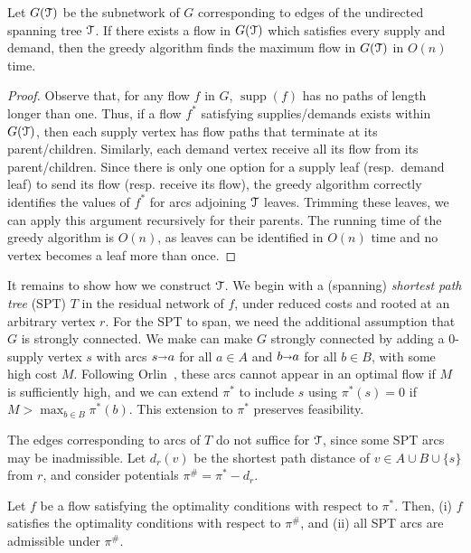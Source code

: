 \documentclass[a4paper,UKenglish]{socg-lipics-v2018}
\def\arcto{\mathord\shortrightarrow}
\def\arc#1#2{#1\arcto#2}
\def\supp{\operatorname{supp}}
\theoremstyle{plain}
\numberwithin{figure}{section}
\def\EMPH#1{\textcolor{BrickRed}{{\emph{#1}}}}
\begin{document}
\begin{toappendix}
\begin{lemma}
\label{lemma:orlin_tree_flow}
Let $G(\EuScript{T})$ be the subnetwork of $G$ corresponding to edges of the
undirected spanning tree $\EuScript{T}$.
If there exists a flow in $G(\EuScript{T})$ which satisfies every supply and demand,
then the greedy algorithm finds the maximum flow in $G(\EuScript{T})$ in $O(n)$ time.
\end{lemma}
\begin{proof}
Observe that, for any flow $f$ in $G$, $\supp(f)$ has no paths of length longer
than one.
Thus, if a flow $f^*$ satisfying supplies/demands exists within $G(\EuScript{T})$,
then each supply vertex has flow paths that terminate at its parent/children.
Similarly, each demand vertex receive all its flow from its parent/children.
Since there is only one option for a supply leaf (resp.\ demand leaf) to send
its flow (resp. receive its flow), the greedy algorithm correctly identifies
the values of $f^*$ for arcs adjoining $\EuScript{T}$ leaves.
Trimming these leaves, we can apply this argument recursively for their parents.
The running time of the greedy algorithm is $O(n)$, as leaves can be identified
in $O(n)$ time and no vertex becomes a leaf more than once.
\end{proof}

It remains to show how we construct $\EuScript{T}$.
We begin with a (spanning) \EMPH{shortest path tree} (SPT) $T$ in the residual
network of $f$, under reduced costs and rooted at an arbitrary vertex $r$.
For the SPT to span, we need the additional assumption that $G$ is strongly
connected.
We make can make $G$ strongly connected by adding a 0-supply vertex $s$ with
arcs $\arc sa$ for all $a \in A$ and $\arc ba$ for all $b \in B$, with some
high cost $M$.
Following Orlin~\cite{O93}, these arcs cannot appear in an optimal flow if $M$
is sufficiently high, and we can extend $\pi^*$ to include $s$ using
$\pi^*(s) = 0$ if $M > \max_{b \in B} \pi^*(b)$.
This extension to $\pi^*$ preserves feasibility.

The edges corresponding to arcs of $T$ do not suffice for $\EuScript{T}$, since
some SPT arcs may be inadmissible.
Let $d_r(v)$ be the shortest path distance of $v \in A \cup B \cup \{s\}$ from
$r$, and consider potentials $\pi^\# = \pi^* - d_r$.

\begin{lemma}
\label{lemma:orlin_spt_dist}
Let $f$ be a flow satisfying the optimality conditions with respect to $\pi^*$.
Then, (i) $f$ satisfies the optimality conditions with respect to $\pi^\#$, and
(ii) all SPT arcs are admissible under $\pi^\#$.
\end{lemma}


\end{toappendix}
\end{document}
